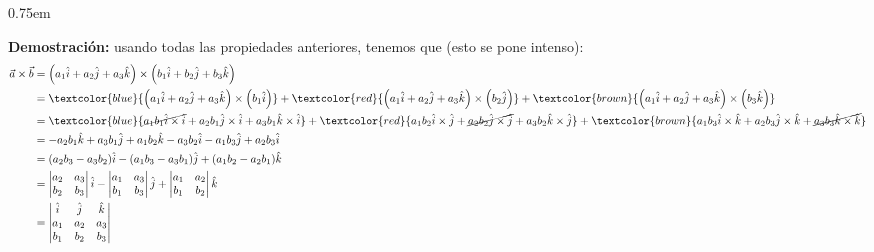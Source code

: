 \documentclass[12pt, fleqn]{report}                             %
\newenvironment{SmallIndentation}[1][0.75em]                    %
        {\begin{adjustwidth}{#1}{}\begin{footnotesize}}             %
        {\end{footnotesize}\end{adjustwidth}}                       %
\theoremstyle{break}                                            %
\newcommand{\Wrap}[1]{\left( #1 \right)}                        %
\begin{document}
            \begin{SmallIndentation}
                \textbf{Demostración:} usando todas las propiedades anteriores, tenemos que (esto se pone intenso):
                \begin{align*}
                    \vec{a} \times \vec{b} &= \Wrap{a_1\hat{i} + a_2\hat{j} + a_3\hat{k}} \times \Wrap{b_1\hat{i} + b_2\hat{j} + b_3\hat{k}}\\
                    &= \textcolor{blue}{\Wrap{a_1\hat{i} + a_2\hat{j} + a_3\hat{k}} \times \Wrap{b_1\hat{i}}}
                    + \textcolor{red}{\Wrap{a_1\hat{i} + a_2\hat{j} + a_3\hat{k}} \times \Wrap{b_2\hat{j}}}
                    + \textcolor{brown}{\Wrap{a_1\hat{i} + a_2\hat{j} + a_3\hat{k}} \times \Wrap{b_3\hat{k}}}\\
                    &= \textcolor{blue}{\cancel{a_1b_1\hat{i}\times\hat{i}} + a_2b_1\hat{j}\times\hat{i} + a_3b_1\hat{k}\times\hat{i}}
                    + \textcolor{red}{a_1b_2\hat{i}\times\hat{j} + \cancel{a_2b_2\hat{j}\times\hat{j}} + a_3b_2\hat{k}\times\hat{j}}
                    + \textcolor{brown}{a_1b_3\hat{i}\times\hat{k} + a_2b_3\hat{j}\times\hat{k} + \cancel{a_3b_3\hat{k}\times\hat{k}}}\\
                    &= -a_2b_1\hat{k} + a_3b_1\hat{j} + a_1b_2\hat{k} - a_3b_2\hat{i} - a_1b_3\hat{j} + a_2b_3\hat{i}\\
                    &= (a_2b_3 - a_3b_2)\hat{i} - (a_1b_3 - a_3b_1)\hat{j} + (a_1b_2 - a_2b_1)\hat{k}\\
                    &= \begin{vmatrix}
                        a_2 & a_3\\
                        b_2 & b_3
                    \end{vmatrix}\hat{i} - 
                    \begin{vmatrix}
                        a_1 & a_3\\
                        b_1 & b_3
                    \end{vmatrix}\hat{j} + 
                    \begin{vmatrix}
                        a_1 & a_2\\
                        b_1 & b_2
                    \end{vmatrix}\hat{k}\\
                    &= \begin{vmatrix}
                        \hat{i} & \hat{j} & \hat{k}\\
                        a_1 & a_2 & a_3\\
                        b_1 & b_2 & b_3
                    \end{vmatrix}
                \end{align*}
            \end{SmallIndentation}
        
\end{document}

